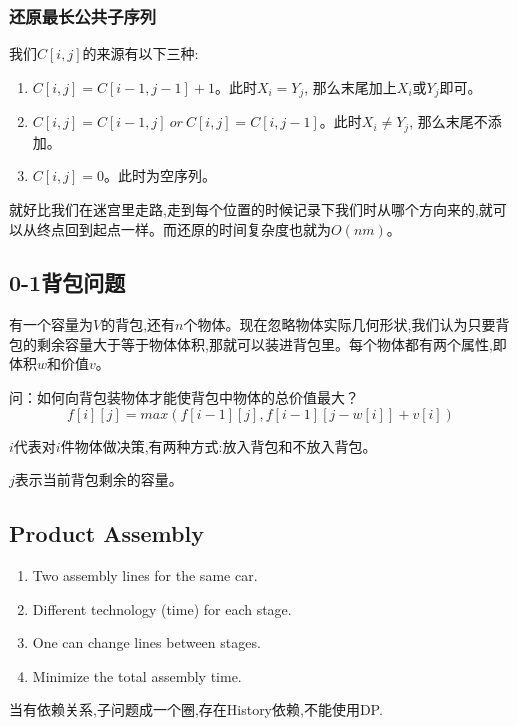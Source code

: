 \documentclass{article}
\begin{document}
\subsubsection{还原最长公共子序列}
我们$C[i,j]$的来源有以下三种:
\begin{enumerate}
    \item $C[i,j] = C[i-1,j-1] + 1$。此时$X_i = Y_j$, 那么末尾加上$X_i$或$Y_j$即可。
    \item $C[i,j] = C[i-1,j] \ or \ C[i,j] = C[i,j-1]$。此时$X_i \neq Y_j$, 那么末尾不添加。
    \item $C[i,j] = 0$。此时为空序列。
\end{enumerate}\par
就好比我们在迷宫里走路,走到每个位置的时候记录下我们时从哪个方向来的,就可以从终点回到起点一样。而还原的时间复杂度也就为$O(nm)$。

\hspace*{\fill}\par

\subsection{0-1背包问题}
有一个容量为$V$的背包,还有$n$个物体。现在忽略物体实际几何形状,我们认为只要背包的剩余容量大于等于物体体积,那就可以装进背包里。每个物体都有两个属性,即体积$w$和价值$v$。\par
问：如何向背包装物体才能使背包中物体的总价值最大？
$$f[i][j] = max(f[i-1][j],f[i-1][j-w[i]] + v[i])$$\par
$i$代表对$i$件物体做决策,有两种方式:放入背包和不放入背包。\par
$j$表示当前背包剩余的容量。
\hspace*{\fill}\par

\subsection{Product Assembly}
\begin{enumerate}
    \item Two assembly lines for the same car.
    \item Different technology (time) for each stage.
    \item One can change lines between stages.
    \item Minimize the total assembly time.
\end{enumerate}

当有依赖关系,子问题成一个圈,存在History依赖,不能使用DP.
\end{document}
